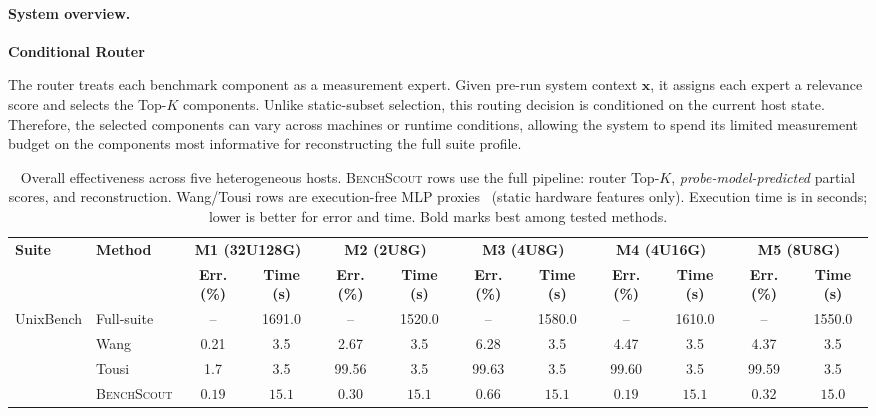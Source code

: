 \documentclass[sigplan,10pt, anonymous]{acmart}
\newcommand{\ourmethod}{\textsc{BenchScout}\xspace}
\begin{document}
\paragraph{System overview.}

\textbf{Conditional Router}

The router treats each benchmark component as a measurement expert. Given pre-run system context $\mathbf{x}$, it assigns each expert a relevance score and selects the Top-$K$ components. Unlike static-subset selection, this routing decision is conditioned on the current host state. Therefore, the selected components can vary across machines or runtime conditions, allowing the system to spend its limited measurement budget on the components most informative for reconstructing the full suite profile.
\begin{table}[t]
\centering
\caption{Overall effectiveness across five heterogeneous hosts.
\ourmethod{} rows use the full pipeline: router Top-$K$, \emph{probe-model-predicted} partial scores, and reconstruction.
Wang/Tousi rows are execution-free MLP proxies~\cite{wang2019predicting,tousi2022comparative} (static hardware features only).
Execution time is in seconds; lower is better for error and time. Bold marks best among tested methods.}
\label{tab:overall-effectiveness-expanded}
\footnotesize
\setlength{\tabcolsep}{4.5pt}
\begin{tabular}{llcccccccccc}
\toprule
\multirow{2}{*}{\textbf{Suite}} & \multirow{2}{*}{\textbf{Method}} & \multicolumn{2}{c}{\textbf{M1 (32U128G)}} & \multicolumn{2}{c}{\textbf{M2 (2U8G)}} & \multicolumn{2}{c}{\textbf{M3 (4U8G)}} & \multicolumn{2}{c}{\textbf{M4 (4U16G)}} & \multicolumn{2}{c}{\textbf{M5 (8U8G)}} \\
\cmidrule(lr){3-4} \cmidrule(lr){5-6} \cmidrule(lr){7-8} \cmidrule(lr){9-10} \cmidrule(lr){11-12}
& & \textbf{Err. (\%)} & \textbf{Time (s)} & \textbf{Err. (\%)} & \textbf{Time (s)} & \textbf{Err. (\%)} & \textbf{Time (s)} & \textbf{Err. (\%)} & \textbf{Time (s)} & \textbf{Err. (\%)} & \textbf{Time (s)} \\
\midrule

\multirow{4}{*}{UnixBench} 
& Full-suite & -- & 1691.0 & -- & 1520.0 & -- & 1580.0 & -- & 1610.0 & -- & 1550.0 \\
& Wang~\cite{wang2019predicting} & 0.21 & 3.5 & 2.67 & 3.5 & 6.28 & 3.5 & 4.47 & 3.5 & 4.37 & 3.5 \\
& Tousi~\cite{tousi2022comparative} & 1.7 & 3.5 & 99.56 & 3.5 & 99.63 & 3.5 & 99.60 & 3.5 & 99.59 & 3.5 \\
& \ourmethod & $\mathbf{0.19}$ & $\mathbf{15.1}$ & $\mathbf{0.30}$ & $\mathbf{15.1}$ & $\mathbf{0.66}$ & $\mathbf{15.1}$ & $\mathbf{0.19}$ & $\mathbf{15.1}$ & $\mathbf{0.32}$ & $\mathbf{15.0}$ \\


\end{tabular}
\end{table}
\end{document}
